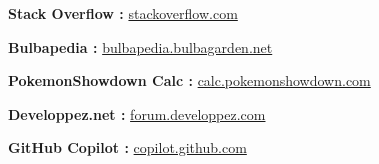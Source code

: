 \documentclass[12pt,a4paper, twoside]{article}
\begin{document}
\label{annexe:stackoverflow}
\textbf{Stack Overflow :} \href{https://stackoverflow.com/questions/tagged/sdl}{stackoverflow.com}

\label{annexe:bulbapedia}
\textbf{Bulbapedia :} \href{https://bulbapedia.bulbagarden.net/wiki}{bulbapedia.bulbagarden.net}

\label{annexe:showdown}
\textbf{PokemonShowdown Calc :} \href{https://calc.pokemonshowdown.com}{calc.pokemonshowdown.com}

\label{annexe:developpez}
\textbf{Developpez.net :} \href{https://forum.developpez.com}{forum.developpez.com}

\label{annexe:copilot}
\textbf{GitHub Copilot :} \href{https://copilot.github.com/}{copilot.github.com}
\end{document}
